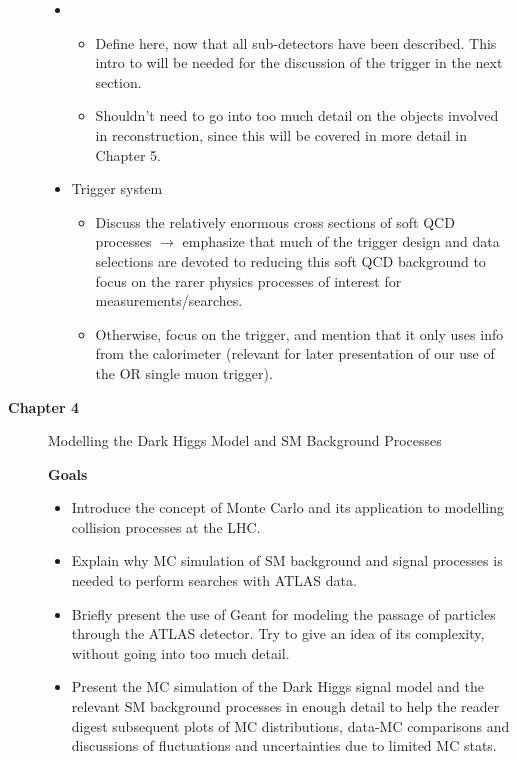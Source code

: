 \begin{description}
\begin{itemize}
\item \met 
\begin{itemize}
\item Define \met here, now that all sub-detectors have been described. This intro to \met will be needed for the discussion of the \met trigger in the next section.
\item Shouldn't need to go into too much detail on the objects involved in \met reconstruction, since this will be covered in more detail in Chapter 5.
\end{itemize}
\item Trigger system 
\begin{itemize}
\item Discuss the relatively enormous cross sections of soft QCD processes $\rightarrow$ emphasize that much of the trigger design and data selections are devoted to reducing this soft QCD background to focus on the rarer physics processes of interest for measurements/searches. 
\item Otherwise, focus on the \met trigger, and mention that it only uses info from the calorimeter (relevant for later presentation of our use of the \met OR single muon trigger).
\end{itemize}
\end{itemize}

\item[\textbf{Chapter 4}] Modelling the Dark Higgs Model and SM Background Processes

\textbf{Goals}
\begin{itemize}
\item Introduce the concept of Monte Carlo and its application to modelling collision processes at the LHC. 
\item Explain why MC simulation of SM background and signal processes is needed to perform searches with ATLAS data.
\item Briefly present the use of Geant for modeling the passage of particles through the ATLAS detector. Try to give an idea of its complexity, without going into too much detail.
\item Present the MC simulation of the Dark Higgs signal model and the relevant SM background processes in enough detail to help the reader digest subsequent plots of MC distributions, data-MC comparisons and discussions of fluctuations and uncertainties due to limited MC stats.  
\end{itemize}


\end{description}
